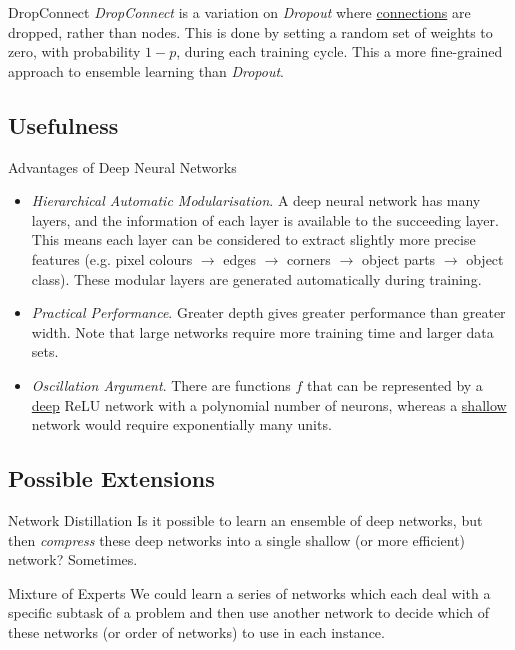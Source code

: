 \documentclass[11pt,a4paper]{article}
\begin{document}
\begin{definition}{DropConnect}
  \textit{DropConnect} is a variation on \textit{Dropout} where \underline{connections} are dropped, rather than nodes. This is done by setting a random set of weights to zero, with probability $1-p$, during each training cycle. This a more fine-grained approach to ensemble learning than \textit{Dropout}.
\end{definition}

\subsection{Usefulness}

\begin{remark}{Advantages of Deep Neural Networks}
  \begin{itemize}
    \item \textit{Hierarchical Automatic Modularisation}. A deep neural network has many layers, and the information of each layer is available to the succeeding layer. This means each layer can be considered to extract slightly more precise features (e.g. pixel colours $\to$ edges $\to$ corners $\to$ object parts $\to$ object class). These modular layers are generated automatically during training.
    \item \textit{Practical Performance}. Greater depth gives greater performance than greater width. Note that large networks require more training time and larger data sets.
    \item \textit{Oscillation Argument}. There are functions $f$ that can be represented by a \underline{deep} ReLU network with a polynomial number of neurons, whereas a \underline{shallow} network would require exponentially many units.
  \end{itemize}
\end{remark}

\subsection{Possible Extensions}

\begin{proposition}{Network Distillation}
  Is it possible to learn an ensemble of deep networks, but then \textit{compress} these deep networks into a single shallow (or more efficient) network? Sometimes.
\end{proposition}

\begin{proposition}{Mixture of Experts}
  We could learn a series of networks which each deal with a specific subtask of a problem and then use another network to decide which of these networks (or order of networks) to use in each instance.
\end{proposition}
\end{document}
